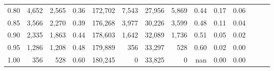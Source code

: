 \begin{tabular}{rrrrrrrrrrrrrr}
0.80 &   4,652 &  2,565 &  0.36 &  172,702 &    7,543 &  27,956 &   5,869 &  0.44 &  0.17 &      0.06 \\
0.85 &   3,566 &  2,270 &  0.39 &  176,268 &    3,977 &  30,226 &   3,599 &  0.48 &  0.11 &      0.04 \\
0.90 &   2,335 &  1,863 &  0.44 &  178,603 &    1,642 &  32,089 &   1,736 &  0.51 &  0.05 &      0.02 \\
0.95 &   1,286 &  1,208 &  0.48 &  179,889 &      356 &  33,297 &     528 &  0.60 &  0.02 &      0.00 \\
1.00 &     356 &    528 &  0.60 &  180,245 &        0 &  33,825 &       0 &   nan &  0.00 &      0.00 \\
\bottomrule
\end{tabular}
